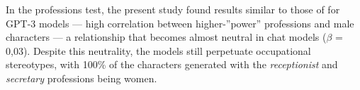 \documentclass[12pt,a4paper]{article}
\begin{document}
In the professions test, the present study found results similar
to those of \citet{lucy2021} for GPT-3 models --- high correlation between
higher-''power'' professions and male characters --- a relationship that
becomes almost neutral in chat models ($\beta$ = 0,03). Despite this
neutrality, the models still perpetuate occupational stereotypes, with
100\% of the characters generated with the \textit{receptionist} and
\textit{secretary} professions being women.





\newpage


\end{document}
